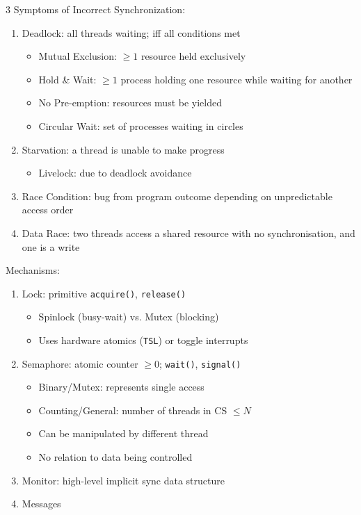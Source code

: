 \documentclass[12pt, a4paper]{article}
\begin{document}
\begin{multicols*}{3}
Symptoms of Incorrect Synchronization:
\begin{enumerate}[\roman*.]
  \item Deadlock: all threads waiting; iff all conditions met
    \begin{itemize}[leftmargin=*]\vspace{3pt}
      \item Mutual Exclusion: $\geq 1$ resource held exclusively
      \item Hold \& Wait: $\geq 1$ process holding one resource while waiting for another
      \item No Pre-emption: resources must be yielded
      \item Circular Wait: set of processes waiting in circles
    \end{itemize}
  \item Starvation: a thread is unable to make progress 
    \begin{itemize}[leftmargin=*]\vspace{3pt}
      \item Livelock: due to deadlock avoidance
    \end{itemize}
  \item Race Condition: bug from program outcome depending on unpredictable access order
  \item Data Race: two threads access a shared resource with no synchronisation, and one is a write 
\end{enumerate}

Mechanisms:
\begin{enumerate}[\roman*.]
  \item Lock: primitive \lstinline|acquire()|, \lstinline|release()|
    \begin{itemize}[leftmargin=*]\vspace{3pt}
      \item Spinlock (busy-wait) vs. Mutex (blocking)
      \item Uses hardware atomics (\lstinline|TSL|) or toggle interrupts
    \end{itemize}
  \item Semaphore: atomic counter $\geq 0$; \lstinline|wait()|, \lstinline|signal()|   
    \begin{itemize}[leftmargin=*]\vspace{3pt}
      \item Binary/Mutex: represents single access 
      \item Counting/General: number of threads in CS $\leq N$
      \item Can be manipulated by different thread 
      \item No relation to data being controlled
    \end{itemize}
  \item Monitor: high-level implicit sync data structure
  \item Messages
\end{enumerate}
\vspace{-1em}
\colbreak

\end{multicols*}
\end{document}
